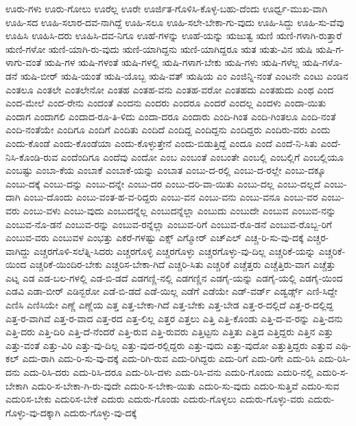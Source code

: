 {ಊರು-ಗಳು
ಊರು-ಗೋಲು
ಊರೆಲ್ಲ
ಊರೇ
ಊರ್ಜಿತ-ಗೊಳಿಸಿ-ಕೊಳ್ಳ-ಬಹು-ದೆಂದು
ಊರ್ಧ್ವ-ಮುಖ-ವಾಗಿ
ಊಹಿ-ಸದ
ಊಹಿ-ಸಲಾರ-ದವ-ನಾಗಿದ್ದೆ
ಊಹಿ-ಸಲೂ
ಊಹಿ-ಸಲೇ-ಬೇಕಾ-ಗು-ವುದು
ಊಹಿ-ಸಿದ್ದು
ಊಹಿ-ಸು-ವೆವು
ಊಹಿಸಿ
ಊಹಿಸಿ-ದರು
ಊಹಿಸಿ-ದವ-ನಿಗೂ
ಊಹೆ-ಗಳನ್ನು
ಊಹೆ-ಯನ್ನು
ಋಜುತ್ವ
ಋಣಿ
ಋಣಿ-ಗಳಾಗಿ-ರುತ್ತಾರೆ
ಋಣಿ-ಗಳೋ
ಋಣಿ-ಯಾಗಿ-ರು-ವುದು
ಋಣಿ-ಯಾಗಿದ್ದನು
ಋಣಿ-ಯಾಗಿದ್ದರೂ
ಋತ
ಋತು-ವಿನ
ಋಷಿ
ಋಷಿ-ಗ-ಳಾಗು-ವಂತೆ
ಋಷಿ-ಗಳ
ಋಷಿ-ಗಳಂತೆ
ಋಷಿ-ಗಳಲ್ಲಿ
ಋಷಿ-ಗಳಾಗ-ಬೇಕು
ಋಷಿ-ಗಳು
ಋಷಿ-ಗಳೆಲ್ಲ
ಋಷಿ-ಗಳೊ-ಡನೆ
ಋಷಿ-ಬೀರ್
ಋಷಿ-ಯಂತೆ
ಋಷಿ-ಯೊಬ್ಬ
ಋಷಿ-ವತ್
ಋಷಿಯ
ಎಂ
ಎಂಜಿನ್ನಿ-ನಂತೆ
ಎಂಟನೇ
ಎಂಟು
ಎಂಡಿನ
ಎಂತಲೂ
ಎಂತಲೇ
ಎಂತಲೇನೋ
ಎಂತಹ
ಎಂತಹ-ವನು
ಎಂತಹ-ವರೋ
ಎಂತಹದು
ಎಂತಹುದು
ಎಂಥ
ಎಂದ
ಎಂದ-ಮೇಲೆ
ಎಂದ-ರೇನು
ಎಂದಂತೆ
ಎಂದನು
ಎಂದರು
ಎಂದರೂ
ಎಂದರೆ
ಎಂದಲ್ಲ
ಎಂದಳು
ಎಂದಾ-ಯಿತು
ಎಂದಾಗ
ಎಂದಾಗಲಿ
ಎಂದಾದ-ರೂ-ತಿ-ಳಿದು
ಎಂದಾ-ದರೂ
ಎಂದಾರು
ಎಂದಿ-ಗಿಂತ
ಎಂದಿ-ಗಿಂತಲೂ
ಎಂದಿ-ನಂತೆ
ಎಂದಿ-ನಂತೆಯೇ
ಎಂದಿಗೂ
ಎಂದಿಗೆ
ಎಂದಿತು
ಎಂದಿದೆ
ಎಂದಿದ್ದ
ಎಂದಿದ್ದನು
ಎಂದಿದ್ದರು
ಎಂದಿರು-ವರು
ಎಂದು
ಎಂದು-ಕೊಂಡೆ
ಎಂದು-ಕೊಂಡೆಯಾ
ಎಂದು-ಕೊಳ್ಳುತ್ತೇನೆ
ಎಂದು-ಬಿಡುತ್ತಿದ್ದೆ
ಎಂದೂ
ಎಂದೆ
ಎಂದೆ-ನಿ-ಸಿತು
ಎಂದೆ-ನಿಸಿ-ಕೊಂಡಿ-ರುವ
ಎಂದೆಂದಿಗೂ
ಎಂದೆವು
ಎಂದೋ
ಎಂಬ
ಎಂಬಂತೆ
ಎಂಬಂತೇ
ಎಂಬಲ್ಲಿ
ಎಂಬಲ್ಲಿಗೆ
ಎಂಬಲ್ಲಿಯೂ
ಎಂಬಷ್ಟು
ಎಂಬಾ-ಕೆಯ
ಎಂಬಾಕೆ
ಎಂಬಾಕೆ-ಯನ್ನು
ಎಂಬಾತ
ಎಂಬು-ದ-ರಲ್ಲಿ
ಎಂಬು-ದ-ರಲ್ಲೇ
ಎಂಬು-ದಕ್ಕೂ
ಎಂಬು-ದಕ್ಕೆ
ಎಂಬು-ದನ್ನು
ಎಂಬು-ದನ್ನೇ
ಎಂಬು-ದರ
ಎಂಬು-ದರಿ-ವಾ-ಯಿತು
ಎಂಬು-ದಲ್ಲ
ಎಂಬು-ದಲ್ಲದೆ
ಎಂಬು-ದಾಗಿ
ಎಂಬು-ದೊಂದು
ಎಂಬು-ವಂತ-ಹ-ವ-ರಿದ್ದರು
ಎಂಬು-ವನ
ಎಂಬು-ವನು
ಎಂಬು-ವನೂ
ಎಂಬು-ವರ
ಎಂಬು-ವರು
ಎಂಬು-ವಳು
ಎಂಬು-ವುದು
ಎಂಬುದನ್ನೆಲ್ಲ
ಎಂಬುದನ್ನೆಲ್ಲಾ
ಎಂಬುದು
ಎಂಬುದೇ
ಎಂಬುವ
ಎಂಬುವ-ನನ್ನು
ಎಂಬುವ-ನೊ-ಡನೆ
ಎಂಬುವ-ರನ್ನು
ಎಂಬುವ-ರನ್ನೆಲ್ಲಾ
ಎಂಬುವ-ರಿಗೆ
ಎಂಬುವ-ರೊ-ಡನೆ
ಎಂಬುವ-ರೊಬ್ಬ-ರಿಗೆ
ಎಂಬುವ-ವರು
ಎಂಬುವಳ
ಎಂಭತ್ತು
ಎಕರೆ-ಗಳಷ್ಟು
ಎಕ್ಸ್
ಎಗ್ಮೋರ್
ಎಚ್ಎಲ್
ಎಚ್ಚ-ರಿ-ಸು-ವು-ದಕ್ಕೆ
ಎಚ್ಚರ-ವಾಗಿದ್ದು
ಎಚ್ಚರಗೊಳಿ-ಸಲೆತ್ನಿ-ಸಿದರು
ಎಚ್ಚರಗೊಳ್ಳಿ
ಎಚ್ಚರಗೊಳ್ಳು
ಎಚ್ಚರಗೊಳ್ಳು-ವು-ದಿಲ್ಲ
ಎಚ್ಚರಿಕೆ-ಯನ್ನು
ಎಚ್ಚರಿಕೆ-ಯಿಂದ
ಎಚ್ಚರಿಕೆ-ಯಿಂದಿರ-ಬೇಕು
ಎಚ್ಚರಿಸ-ಬೇಕಾ-ಗಿದೆ
ಎಚ್ಚರಿ-ಸಿತು
ಎಚ್ಚರಿಕೆ
ಎಚ್ಚೆತ್ತರು
ಎಚ್ಚೆತ್ತಿರು-ವಾಗ
ಎಚ್ಚೆತ್ತು
ಎಟ್ನ
ಎಡ
ಎಡ-ಬಲ-ಗಳಲ್ಲಿ
ಎಡ-ಬಿ-ಡದೆ
ಎಡಗಣ್ಣಿ-ನಲ್ಲಿ
ಎಡಗಣ್ಣಿನ
ಎಡಗೈ-ಯನ್ನು
ಎಡಗೈ-ಯಲ್ಲಿ
ಎಡಗೈ-ಯಿಂದ
ಎಡವಿ
ಎಡಾ-ಬೀರ್
ಎಡಿನ್ಬರೋ
ಎಡೆ-ಬಿ-ಡದೆ
ಎಡೆ-ಯಿಲ್ಲ
ಎಡೆಗೆ
ಎಡೆಯೇ
ಎಡ್-ವರ್ಡ್
ಎಡ್ವರ್ಡ್ಸ್
ಎಣಿ-ಸಿದ್ದೇ
ಎಣಿಸಿ
ಎಣಿಸಿಯೇ
ಎಣ್ಣೆ
ಎಣ್ಣೆಯ
ಎತ್ತ
ಎತ್ತ-ಬೇಕಾ-ಗಿದೆ
ಎತ್ತ-ಬೇಕು
ಎತ್ತ-ಬೇಡ
ಎತ್ತ-ರ-ದಲ್ಲಿದೆ
ಎತ್ತ-ರ-ದಲ್ಲಿದ್ದ
ಎತ್ತ-ರ-ವಾಗಿವೆ
ಎತ್ತ-ರ-ವಾದ
ಎತ್ತ-ರದ
ಎತ್ತ-ಲಿಲ್ಲ
ಎತ್ತರ
ಎತ್ತಲು
ಎತ್ತಿ
ಎತ್ತಿ-ಕೊಂಡು
ಎತ್ತಿ-ದ-ವ-ರನ್ನು
ಎತ್ತಿ-ದನು
ಎತ್ತಿ-ದರು
ಎತ್ತಿ-ದಿರಿ
ಎತ್ತಿ-ದೆ-ನೆಂದರೆ
ಎತ್ತಿ-ರುವ
ಎತ್ತಿ-ರುವರು
ಎತ್ತಿಟ್ಟನು
ಎತ್ತಿತು
ಎತ್ತಿದ
ಎತ್ತಿದ್ದರು
ಎತ್ತಿನ
ಎತ್ತು
ಎತ್ತು-ವಂತೆ
ಎತ್ತು-ವಿರಿ
ಎತ್ತು-ವು-ದಿಲ್ಲ
ಎತ್ತು-ವುದ-ರಲ್ಲಿದ್ದರು
ಎತ್ತು-ವುದು
ಎತ್ತು-ವುದೋ
ಎತ್ತುತ್ತಿದ್ದರು
ಎತ್ತುವ
ಎಥಿ-ಕಲ್
ಎದು-ರಾಗಿ
ಎದು-ರಿ-ಸು-ವು-ದಕ್ಕೆ
ಎದು-ರಿಗಿ-ರುವ
ಎದು-ರಿಗಿದ್ದರು
ಎದು-ರಿಗೆ
ಎದು-ರಿಗೇ
ಎದು-ರಿಸಿ
ಎದು-ರಿಸಿ-ದನು
ಎದು-ರಿಸಿ-ದರು
ಎದು-ರಿಸಿ-ದರೂ
ಎದು-ರಿಸಿ-ದಳು
ಎದು-ರಿಸಿ-ವನು
ಎದುರಿ-ಗೊಂದು
ಎದುರಿ-ನಲ್ಲಿ
ಎದುರಿ-ಸ-ಬೇಕಾಗಿ
ಎದುರಿ-ಸ-ಬೇಕಾ-ಗಿ-ರು-ವುದೇ
ಎದುರಿ-ಸ-ಬೇಕಾ-ಯಿತು
ಎದುರಿ-ಸು-ವುದು
ಎದುರಿ-ಸುತ್ತಿವೆ
ಎದುರಿ-ಸುವ
ಎದುರಿಸ-ಬೇಕು
ಎದುರಿಸ-ಬೇಕೆ
ಎದುರು
ಎದುರು-ಗೊಂಡು
ಎದುರು-ಗೊಳ್ಳಲು
ಎದುರು-ಗೊಳ್ಳು-ವರು
ಎದುರು-ಗೊಳ್ಳು-ವು-ದಕ್ಕಾಗಿ
ಎದುರು-ಗೊಳ್ಳು-ವು-ದಕ್ಕೆ
}
